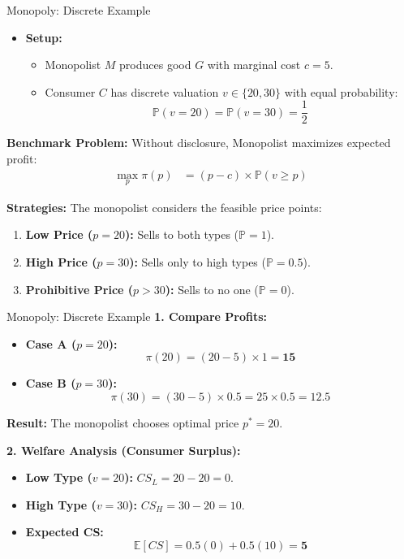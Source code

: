 \documentclass{beamer}
\begin{document}
\begin{frame}{Monopoly: Discrete Example}\label{Mdiscrete}
    \begin{itemize}
        \item \textbf{Setup:}
        \begin{itemize}
            \item Monopolist $M$ produces good $G$ with marginal cost $c=5$.
            \item Consumer $C$ has discrete valuation $v \in \{20, 30\}$ with equal probability:
            \[
                \mathbb{P}(v=20) = \mathbb{P}(v=30) = \frac{1}{2}
            \]
        \end{itemize}
    \end{itemize}

    \vspace{0.3cm}

    \textbf{Benchmark Problem:} Without disclosure, Monopolist maximizes expected profit:
    \begin{align*}
        \max_{p} \pi(p) &= (p - c) \times \mathbb{P}(v \ge p)
    \end{align*}

    \textbf{Strategies:}
    The monopolist considers the feasible price points:
    \begin{enumerate}
        \item \textbf{Low Price ($p=20$):} Sells to both types ($\mathbb{P} = 1$).
        \item \textbf{High Price ($p=30$):} Sells only to high types ($\mathbb{P} = 0.5$).
        \item \textbf{Prohibitive Price ($p > 30$):} Sells to no one ($\mathbb{P} = 0$).
    \end{enumerate}
\end{frame}

\begin{frame}{Monopoly: Discrete Example}
    \textbf{1. Compare Profits:}
    \begin{itemize}
        \item \textbf{Case A ($p=20$):}
        \[
            \pi(20) = (20 - 5) \times 1 = \mathbf{15}
        \]
        \item \textbf{Case B ($p=30$):}
        \[
            \pi(30) = (30 - 5) \times 0.5 = 25 \times 0.5 = \mathbf{12.5}
        \]
    \end{itemize}
    
    \vspace{0.2cm}
    \textbf{Result:} The monopolist chooses optimal price $\boxed{p^* = 20}$.

    \vspace{0.4cm}
    \textbf{2. Welfare Analysis (Consumer Surplus):}
    \begin{itemize}
        \item \textbf{Low Type ($v=20$):} $CS_L = 20 - 20 = 0$.
        \item \textbf{High Type ($v=30$):} $CS_H = 30 - 20 = 10$.
        \item \textbf{Expected CS:}
        \[
            \mathbb{E}[CS] = 0.5(0) + 0.5(10) = \mathbf{5}
        \]
    \end{itemize}
\end{frame}
\end{document}
